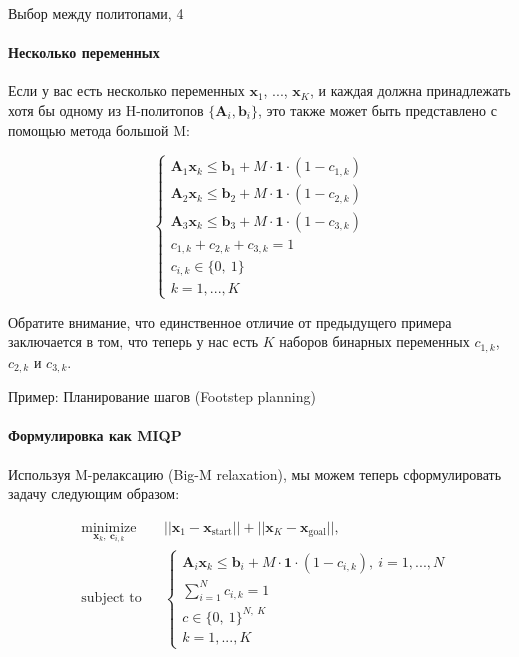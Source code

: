 \documentclass{beamer}
\begin{document}
	
	\begin{frame}{Выбор между политопами, 4}
		\framesubtitle{Несколько переменных}
		\begin{flushleft}
			
			Если у вас есть несколько переменных $\mathbf{x}_1$, ..., $\mathbf{x}_K$, и каждая должна принадлежать хотя бы одному из H-политопов $\{ \mathbf{A}_i, \mathbf{b}_i\}$, это также может быть представлено с помощью метода большой M:
			
			\begin{equation}
				\begin{cases}
					\mathbf{A}_1 \mathbf{x}_k \leq \mathbf{b}_1 + M \cdot \mathbf{1} \cdot (1 - c_{1, k}) \\
					\mathbf{A}_2 \mathbf{x}_k \leq \mathbf{b}_2 + M \cdot \mathbf{1} \cdot (1 - c_{2, k}) \\
					\mathbf{A}_3 \mathbf{x}_k \leq \mathbf{b}_3 + M \cdot \mathbf{1} \cdot (1 - c_{3, k}) \\
					c_{1, k} + c_{2, k} + c_{3, k} = 1 \\
					c_{i, k}  \in \{0, \ 1 \} \\
					k = 1,...,K
				\end{cases}
			\end{equation}
			
			Обратите внимание, что единственное отличие от предыдущего примера заключается в том, что теперь у нас есть $K$ наборов бинарных переменных $c_{1, k}$, $c_{2, k}$ и $c_{3, k}$.
			
		\end{flushleft}
	\end{frame}
	
	
	
	
	
	
	
	\begin{frame}{Пример: Планирование шагов (Footstep planning)}
		\framesubtitle{Формулировка как MIQP}
		\begin{flushleft}
			
			Используя M-релаксацию (Big-M relaxation), мы можем теперь сформулировать задачу следующим образом:
			
			\begin{equation}
				\begin{aligned}
					& \underset{\mathbf{x}_k, \ \mathbf{c}_{i,k}}{\text{minimize}}
					& & ||\mathbf{x}_1 - \mathbf{x}_{\text{start}}|| + ||\mathbf{x}_K - \mathbf{x}_{\text{goal}}||, \\
					& \text{subject to}
					& & \begin{cases}
						\mathbf{A}_i \mathbf{x}_k \leq \mathbf{b}_i + M \cdot \mathbf{1} \cdot (1 - c_{i, k}), \ i = 1,...,N \\
						\sum_{i=1}^N c_{i, k} = 1 \\
						c  \in \{0, \ 1 \}^{N, \ K} \\
						k = 1,...,K
					\end{cases}
				\end{aligned}
			\end{equation}
			
			
		\end{flushleft}
	\end{frame}
	
\end{document}
